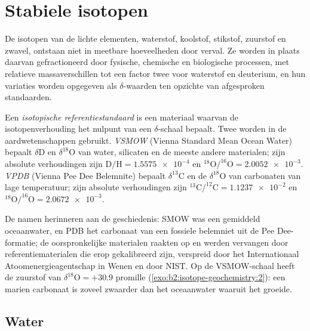 \section{Stabiele isotopen}

De isotopen van de lichte elementen, waterstof, koolstof, stikstof, zuurstof en
zwavel, ontstaan niet in meetbare hoeveelheden door verval. Ze worden in plaats daarvan
gefractioneerd door fysische, chemische en biologische processen, met relatieve
massaverschillen tot een factor twee voor waterstof en deuterium, en hun
variaties worden opgegeven als $\delta$-waarden ten opzichte van afgesproken standaarden.

\begin{definition}\label{def:b2:isotope-geochemistry:standards}
Een \emph{isotopische referentiestandaard} is een
materiaal waarvan de isotopenverhouding het nulpunt van een $\delta$-schaal bepaalt. Twee worden
in de aardwetenschappen gebruikt. \emph{VSMOW} (Vienna Standard Mean Ocean
Water) bepaalt $\delta\mathrm{D}$ en $\delta^{18}\mathrm{O}$ van water, silicaten en
de meeste andere materialen; zijn absolute verhoudingen zijn $\mathrm{D}/\mathrm{H} =
\num{1.5575e-4}$ en $^{18}\mathrm{O}/^{16}\mathrm{O} = \num{2.0052e-3}$.
\emph{VPDB} (Vienna Pee Dee Belemnite) bepaalt $\delta^{13}\mathrm{C}$
en de $\delta^{18}\mathrm{O}$ van carbonaten van lage temperatuur; zijn absolute verhoudingen
zijn $^{13}\mathrm{C}/^{12}\mathrm{C} = \num{1.1237e-2}$ en
$^{18}\mathrm{O}/^{16}\mathrm{O} = \num{2.0672e-3}$.
\end{definition}

De namen herinneren aan de geschiedenis: SMOW was een gemiddeld oceaanwater, en PDB het
carbonaat van een fossiele belemniet uit de Pee Dee-formatie; de oorspronkelijke
materialen raakten op en werden vervangen door referentiematerialen die erop gekalibreerd zijn,
verspreid door het Internationaal Atoomenergieagentschap in Wenen en door NIST.
Op de VSMOW-schaal heeft de zuurstof van  $\delta^{18}\mathrm{O} = +30.9$ promille
(\cref{exo:b2:isotope-geochemistry:2}): een marien carbonaat is zoveel zwaarder dan het oceaanwater waaruit het
groeide.

\subsection{Water}

